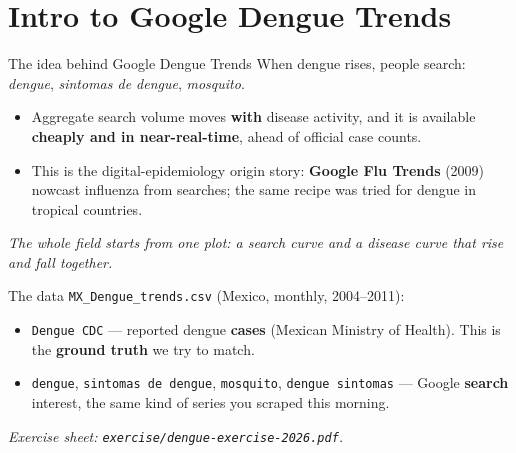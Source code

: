 \documentclass[aspectratio=169,11pt]{beamer}
\begin{document}
\section{Intro to Google Dengue Trends}

\begin{frame}{The idea behind Google Dengue Trends}
  When dengue rises, people search: \emph{dengue}, \emph{sintomas de dengue},
  \emph{mosquito}.
  \begin{itemize}
    \item Aggregate search volume moves \textbf{with} disease activity, and it is
          available \textbf{cheaply and in near-real-time}, ahead of official case counts.
    \item This is the digital-epidemiology origin story: \textbf{Google Flu Trends}
          (2009) nowcast influenza from searches; the same recipe was tried for dengue in
          tropical countries.
  \end{itemize}
  \vspace{0.3em}
  \begin{center}
    \itshape The whole field starts from one plot: a search curve and a disease curve
    that rise and fall together.
  \end{center}
\end{frame}

\begin{frame}{The data}
  \texttt{MX\_Dengue\_trends.csv} (Mexico, monthly, 2004--2011):
  \begin{itemize}
    \item \texttt{Dengue CDC} --- reported dengue \textbf{cases} (Mexican Ministry of
          Health). This is the \textbf{ground truth} we try to match.
    \item \texttt{dengue}, \texttt{sintomas de dengue}, \texttt{mosquito},
          \texttt{dengue sintomas} --- Google \textbf{search} interest, the same kind of
          series you scraped this morning.
  \end{itemize}
  \vspace{0.3em}
  \begin{center}
  \end{center}
  \vspace{0.2em}
  \begin{center}
    \itshape Exercise sheet: \texttt{exercise/dengue-exercise-2026.pdf}.
  \end{center}
\end{frame}
\end{document}
